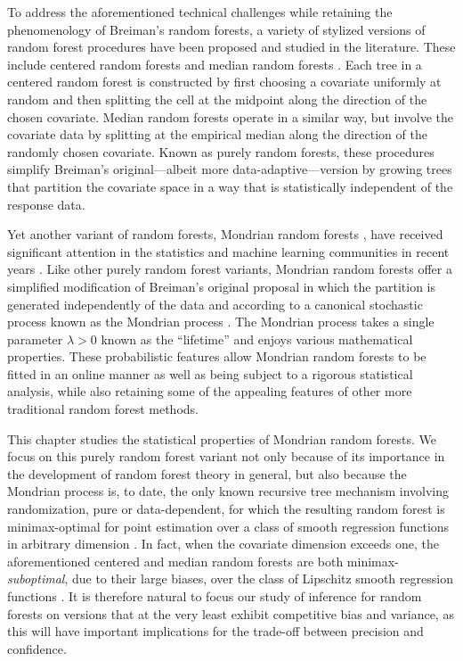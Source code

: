 \documentclass[11pt,lof]{puthesis}
\theoremstyle{break}
\theoremstyle{proof}
\begin{document}
To address the aforementioned technical challenges while retaining the
phenomenology of Breiman's random forests, a variety of stylized versions of
random forest procedures have been proposed and studied in the literature.
These include centered random forests
\citep{biau2012analysis,arnould2023interpolation} and median random forests
\citep{duroux2018impact,arnould2023interpolation}. Each tree in a centered
random forest is constructed by first choosing a covariate uniformly at random
and then splitting the cell at the midpoint along the direction of the chosen
covariate. Median random forests operate in a similar way, but involve the
covariate data by splitting at the empirical median along the direction of the
randomly chosen covariate. Known as purely random forests, these procedures
simplify Breiman's original---albeit more data-adaptive---version by growing
trees that partition the covariate space in a way that is statistically
independent of the response data.

Yet another variant of random forests, Mondrian random forests
\citep{lakshminarayanan2014mondrian}, have received significant attention in
the statistics and machine learning communities in recent years
\citep{ma2020isolation, mourtada2020minimax, scillitoe2021uncertainty,
mourtada2021amf, vicuna2021reducing, gao2022towards, oreilly2022stochastic}.
Like other purely random forest variants, Mondrian random forests offer a
simplified modification of Breiman's original proposal in which the partition is
generated independently of the data and according to a canonical stochastic
process known as the Mondrian process \citep{roy2008mondrian}. The Mondrian
process takes a single parameter $\lambda > 0$ known as the ``lifetime'' and
enjoys various mathematical properties. These probabilistic features allow
Mondrian random forests to be fitted in an online manner as well as being
subject to a rigorous statistical analysis, while also retaining some of the
appealing features of other more traditional random forest methods.

This chapter studies the statistical properties of Mondrian random forests. We
focus on this purely random forest variant not only because of its importance
in the development of random forest theory in general, but also because the
Mondrian process is, to date, the only known recursive tree mechanism involving
randomization, pure or data-dependent, for which the resulting random forest is
minimax-optimal for point estimation over a class of smooth regression
functions in arbitrary dimension \citep{mourtada2020minimax}. In fact, when the
covariate dimension exceeds one, the aforementioned centered and median random
forests are both minimax-\emph{suboptimal}, due to their large biases, over the
class of Lipschitz smooth regression functions \citep{klusowski2021sharp}. It
is therefore natural to focus our study of inference for random forests on
versions that at the very least exhibit competitive bias and variance, as this
will have important implications for the trade-off between precision and
confidence.
\end{document}

